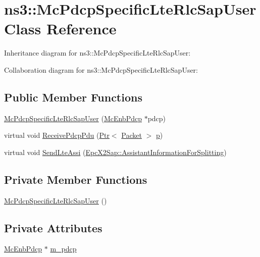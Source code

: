 \hypertarget{classns3_1_1McPdcpSpecificLteRlcSapUser}{}\section{ns3\+:\+:Mc\+Pdcp\+Specific\+Lte\+Rlc\+Sap\+User Class Reference}
\label{classns3_1_1McPdcpSpecificLteRlcSapUser}


Inheritance diagram for ns3\+:\+:Mc\+Pdcp\+Specific\+Lte\+Rlc\+Sap\+User\+:


Collaboration diagram for ns3\+:\+:Mc\+Pdcp\+Specific\+Lte\+Rlc\+Sap\+User\+:
\subsection*{Public Member Functions}
\begin{DoxyCompactItemize}
\item 
\hyperlink{classns3_1_1McPdcpSpecificLteRlcSapUser_a3a0ac7a6e9274bbd69fc1e122298a895}{Mc\+Pdcp\+Specific\+Lte\+Rlc\+Sap\+User} (\hyperlink{classns3_1_1McEnbPdcp}{Mc\+Enb\+Pdcp} $\ast$pdcp)
\item 
virtual void \hyperlink{classns3_1_1McPdcpSpecificLteRlcSapUser_a0fa542c3a11d776ccbf72638695e5322}{Receive\+Pdcp\+Pdu} (\hyperlink{classns3_1_1Ptr}{Ptr}$<$ \hyperlink{classns3_1_1Packet}{Packet} $>$ \hyperlink{lte__link__budget__x2__handover__measures_8m_ac9de518908a968428863f829398a4e62}{p})
\item 
virtual void \hyperlink{classns3_1_1McPdcpSpecificLteRlcSapUser_aa243f787760f63f72961f3f76232a3d0}{Send\+Lte\+Assi} (\hyperlink{structns3_1_1EpcX2Sap_1_1AssistantInformationForSplitting}{Epc\+X2\+Sap\+::\+Assistant\+Information\+For\+Splitting})
\end{DoxyCompactItemize}
\subsection*{Private Member Functions}
\begin{DoxyCompactItemize}
\item 
\hyperlink{classns3_1_1McPdcpSpecificLteRlcSapUser_ad5def872125e82bdd826331182b9af02}{Mc\+Pdcp\+Specific\+Lte\+Rlc\+Sap\+User} ()
\end{DoxyCompactItemize}
\subsection*{Private Attributes}
\begin{DoxyCompactItemize}
\item 
\hyperlink{classns3_1_1McEnbPdcp}{Mc\+Enb\+Pdcp} $\ast$ \hyperlink{classns3_1_1McPdcpSpecificLteRlcSapUser_a7978a417a1d341d932827d5a8c8e52bf}{m\+\_\+pdcp}
\end{DoxyCompactItemize}
